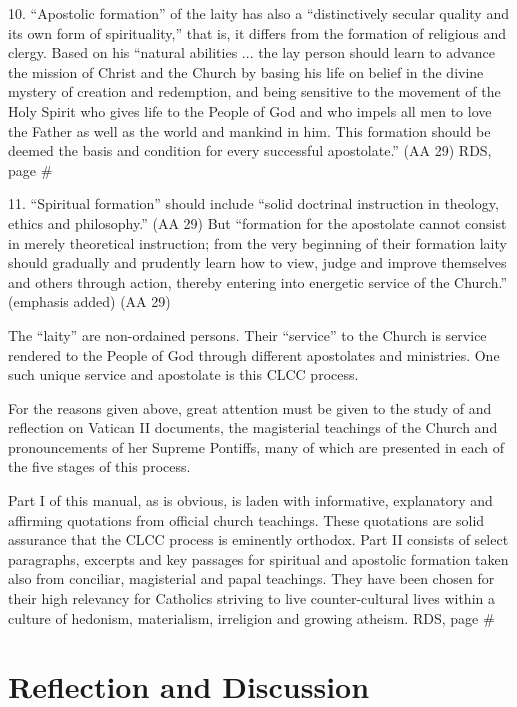 \documentclass[oneside]{book}
\begin{document}
10. ``Apostolic formation'' of the laity has also a ``distinctively secular
quality and its own form of spirituality,'' that is, it differs from the
formation of religious and clergy. Based on his ``natural abilities ... the lay
person should learn to advance the mission of Christ and the Church by basing
his life on belief in the divine mystery of creation and redemption, and being
sensitive to the movement of the Holy Spirit who gives life to the People of God
and who impels all men to love the Father as well as the world and mankind in
him. This formation should be deemed the basis and condition for every
successful apostolate.'' (AA 29)
RDS, page \#

11. ``Spiritual formation'' should include ``solid doctrinal instruction in
theology, ethics and philosophy.'' (AA 29) But ``formation for the apostolate
cannot consist in merely theoretical instruction; from the very beginning of
their formation laity should gradually and prudently learn how to view, judge
and improve themselves and others through action, thereby entering into
energetic service of the Church.'' (emphasis added) (AA 29)

The ``laity'' are non-ordained persons. Their ``service'' to the Church is
service rendered to the People of God through different apostolates and
ministries. One such unique service and apostolate is this CLCC process.

For the reasons given above, great attention must be given to the study of and
reflection on Vatican II documents, the magisterial teachings of the Church and
pronouncements of her Supreme Pontiffs, many of which are presented in each of
the five stages of this process.

Part I of this manual, as is obvious, is laden with informative, explanatory and
affirming quotations from official church teachings. These quotations are solid
assurance that the CLCC process is eminently orthodox. Part II consists of
select paragraphs, excerpts and key passages for spiritual and apostolic
formation taken also from conciliar, magisterial and papal teachings. They have
been chosen for their high relevancy for Catholics striving to live
counter-cultural lives within a culture of hedonism, materialism, irreligion and
growing atheism.
RDS, page \#


\section{Reflection and Discussion}
\end{document}
